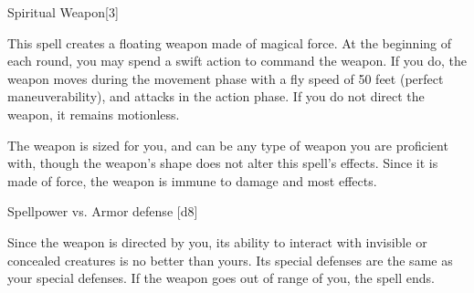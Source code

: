 \begin{spellsection}{Spiritual Weapon}[3]
    \begin{spellheader}
    \end{spellheader}
    \begin{spellcontent}
        \begin{spelltargetinginfo}
        \end{spelltargetinginfo}
        \begin{spelleffects}
            \spelleffect This spell creates a floating weapon made of magical force. At the beginning of each round, you may spend a swift action to command the weapon. If you do, the weapon moves during the movement phase with a fly speed of 50 feet (perfect maneuverability), and attacks in the action phase. If you do not direct the weapon, it remains motionless.

            The weapon is sized for you, and can be any type of weapon you are proficient with, though the weapon's shape does not alter this spell's effects. Since it is made of force, the weapon is immune to damage and most effects.
            \spelldur \durshort \dismissable
        \end{spelleffects}
    \end{spellcontent}
    \begin{spellsubcontent}
        \begin{spelltargetinginfo}
        \end{spelltargetinginfo}
        \begin{spelleffects}
            \begin{spellattack}{Spellpower vs. Armor defense}
                \spellsuccess {}[d8]
            \end{spellattack}
        \end{spelleffects}
    \end{spellsubcontent}
    \begin{spellfooter}
        \spellnotes Since the weapon is directed by you, its ability to interact with invisible or concealed creatures is no better than yours. Its special defenses are the same as your special defenses. If the weapon goes out of range of you, the spell ends.
        \miscastexplode
    \end{spellfooter}
\end{spellsection}

